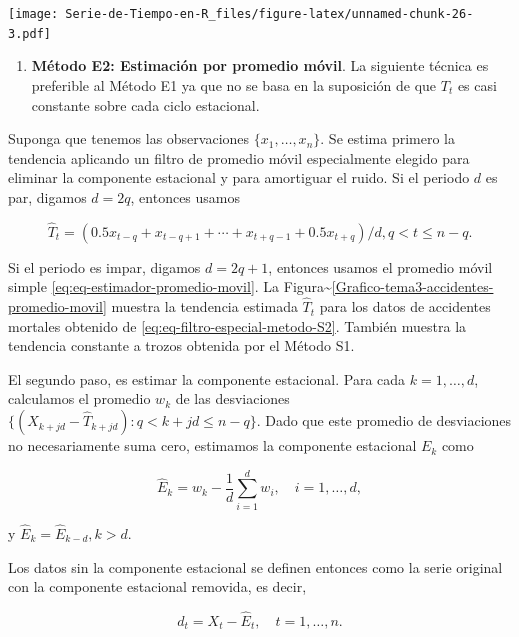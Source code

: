 \documentclass[12pt,]{krantz}
\providecommand{\tightlist}{%
  \setlength{\itemsep}{0pt}\setlength{\parskip}{0pt}}
\theoremstyle{definition}
\theoremstyle{definition}
\theoremstyle{definition}
\theoremstyle{remark}
\begin{document}
\texttt{[image: Serie-de-Tiempo-en-R\_files/figure-latex/unnamed-chunk-26-3.pdf]}

\begin{enumerate}
\def\labelenumi{\arabic{enumi})}
\setcounter{enumi}{1}
\tightlist
\item
  \textbf{Método E2: Estimación por promedio móvil}. La siguiente
  técnica es preferible al Método E1 ya que no se basa en la suposición
  de que \(T_t\) es casi constante sobre cada ciclo estacional.
\end{enumerate}

Suponga que tenemos las observaciones \(\{x_1,\ldots,x_n\}\). Se estima
primero la tendencia aplicando un filtro de promedio móvil especialmente
elegido para eliminar la componente estacional y para amortiguar el
ruido. Si el periodo \(d\) es par, digamos \(d=2q\), entonces usamos

\begin{equation}
\hat{T}_t = (0.5x_{t-q} + x_{t-q+1} + \cdots + x_{t+q-1} + 0.5x_{t+q})/d, q<t\leq n-q.
\label{eq:eq-filtro-especial-metodo-S2}
\end{equation}

Si el periodo es impar, digamos \(d=2q+1\), entonces usamos el promedio
móvil simple \eqref{eq:eq-estimador-promedio-movil}. La
Figura\textasciitilde{}\ref{Grafico-tema3-accidentes-promedio-movil}
muestra la tendencia estimada \(\hat{T}_t\) para los datos de accidentes
mortales obtenido de \eqref{eq:eq-filtro-especial-metodo-S2}. También
muestra la tendencia constante a trozos obtenida por el Método S1.

El segundo paso, es estimar la componente estacional. Para cada
\(k=1,\ldots,d\), calculamos el promedio \(w_k\) de las desviaciones
\(\{(X_{k+jd}-\hat{T}_{k+jd}):q<k+jd\leq n-q\}\). Dado que este promedio
de desviaciones no necesariamente suma cero, estimamos la componente
estacional \(E_k\) como

\begin{equation}
\hat{E}_k = w_k -\frac{1}{d}\sum_{i=1}^dw_i,\quad i=1,\ldots,d,
\label{eq:eq-estimador-Et-metodo-S2}
\end{equation}

y \(\hat{E}_k=\hat{E}_{k-d},k>d\).

Los datos sin la componente estacional se definen entonces como la serie
original con la componente estacional removida, es decir,

\begin{equation}
d_t = X_t-\hat{E}_t,\quad t=1,\ldots,n.
\label{eq:eq-serie-destacionalizada}
\end{equation}
\end{document}
